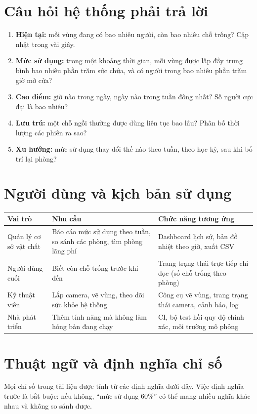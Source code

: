 \documentclass[10pt,a4paper,oneside,openany]{report}
\newcommand{\tabhead}[1]{\textsf{\bfseries\color{ink}#1}}
\newenvironment{bang}{\par\small\rowcolors{2}{rowgray}{white}}{\par\vspace{0.3em}}
\begin{document}
\section{Câu hỏi hệ thống phải trả lời}
\begin{enumerate}
  \item \textbf{Hiện tại:} mỗi vùng đang có bao nhiêu người, còn bao nhiêu chỗ trống? Cập nhật trong vài giây.
  \item \textbf{Mức sử dụng:} trong một khoảng thời gian, mỗi vùng được lấp đầy trung bình bao nhiêu phần trăm sức chứa,
        và có người trong bao nhiêu phần trăm giờ mở cửa?
  \item \textbf{Cao điểm:} giờ nào trong ngày, ngày nào trong tuần đông nhất? Số người cực đại là bao nhiêu?
  \item \textbf{Lưu trú:} một chỗ ngồi thường được dùng liên tục bao lâu? Phân bố thời lượng các phiên ra sao?
  \item \textbf{Xu hướng:} mức sử dụng thay đổi thế nào theo tuần, theo học kỳ, sau khi bố trí lại phòng?
\end{enumerate}

\section{Người dùng và kịch bản sử dụng}
\begin{bang}
\begin{tabularx}{\linewidth}{L{30mm}L{52mm}Y}
\toprule
\tabhead{Vai trò} & \tabhead{Nhu cầu} & \tabhead{Chức năng tương ứng} \\
\midrule
Quản lý cơ sở vật chất & Báo cáo mức sử dụng theo tuần, so sánh các phòng, tìm phòng lãng phí & Dashboard lịch sử, bản đồ nhiệt theo giờ, xuất CSV \\
Người dùng cuối & Biết còn chỗ trống trước khi đến & Trang trạng thái trực tiếp chỉ đọc (số chỗ trống theo phòng) \\
Kỹ thuật viên & Lắp camera, vẽ vùng, theo dõi sức khỏe hệ thống & Công cụ vẽ vùng, trang trạng thái camera, cảnh báo, log \\
Nhà phát triển & Thêm tính năng mà không làm hỏng bản đang chạy & CI, bộ test hồi quy độ chính xác, môi trường mô phỏng \\
\bottomrule
\end{tabularx}
\end{bang}

\section{Thuật ngữ và định nghĩa chỉ số}\label{sec:dinhnghia}
Mọi chỉ số trong tài liệu được tính từ các định nghĩa dưới đây. Việc định nghĩa trước là bắt buộc: nếu không,
\enquote{mức sử dụng 60\%} có thể mang nhiều nghĩa khác nhau và không so sánh được.
\end{document}
